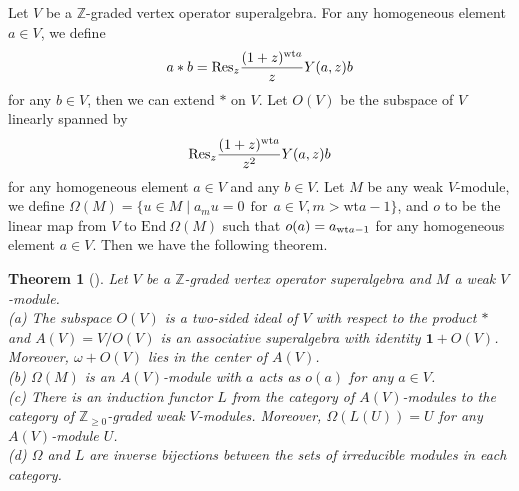 \documentclass[12pt]{article}
\newtheorem{thm}{Theorem}[section]
\begin{document}
Let $V$ be a $\mathbb{Z}$-graded vertex operator superalgebra.
For any homogeneous element $a\in V$, we define
\begin{equation*}
a\ast b=\mbox{Res}_z\frac{(1+z)^{{\rm wt}a}}{z}Y(a,z)b
\end{equation*}
for any $b\in V$,
then we can extend $\ast$ on $V$.
Let $O(V)$ be the subspace of $V$ linearly spanned by
\begin{equation*}
\mbox{Res}_z\frac{(1+z)^{{\rm wt}a}}{z^2}Y(a,z)b
\end{equation*}
for any homogeneous element $a\in V$ and any $b\in V$.
Let $M$ be any weak $V$-module, we define
$\Omega(M)=\{u\in M\mid a_m u=0~~\mbox{for}~~a\in V, m>\mbox{wt}a-1\}$,
and $o$ to be the linear map from $V$ to $\mbox{End}~\Omega(M)$ such that $o(a)=a_{{\rm wt}a-1}$
for any homogeneous element $a\in V$.
Then we have the following theorem.
\begin{thm}[\cite{FZ92,Zhu96}]\label{thmzhu}
Let $V$ be a $\mathbb{Z}$-graded vertex operator superalgebra and $M$ a weak $V$-module.\\
{\rm (a)} The subspace $O(V)$ is a two-sided ideal of $V$ with respect to the product $\ast$
and $A(V)=V/O(V)$ is an associative superalgebra with identity $\textbf{1}+O(V)$.
Moreover, $\omega+O(V)$ lies in the center of $A(V)$.\\
{\rm (b)} $\Omega(M)$ is an $A(V)$-module with $a$ acts as $o(a)$ for any $a\in V$.\\
{\rm (c)} There is an induction functor $L$ from the category of $A(V)$-modules to the category of $\mathbb{Z}_{\geq 0}$-graded weak $V$-modules.
Moreover, $\Omega(L(U))=U$ for any $A(V)$-module $U$.\\
{\rm (d)} $\Omega$ and $L$ are inverse bijections between the sets of irreducible modules in each category.\\
\end{thm}
\end{document}
